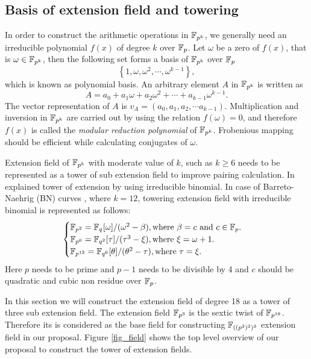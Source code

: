 \subsection{Basis of extension field and towering}
In order to construct the arithmetic operations in $\mathbb{F}_{p^k}$, we generally need an irreducible polynomial $f(x)$ of degree $k$ over $\mathbb{F}_p$. Let $\omega$ be a zero of $f(x)$, that is $\omega \in \mathbb{F}_{p^k}$, then the following set forms a basis of  $\mathbb{F}_{p^k}$ over $\mathbb{F}_p$
\begin{equation}\label{basis_fpm}
\left\lbrace 1, \omega, \omega^2 , \cdots, \omega^{k-1} \right\rbrace,
\end{equation}
which is known as polynomial basis. An arbitrary element $A$ in  $\mathbb{F}_{p^k}$ is written as
\begin{equation}\label{element_fpm}
A = a_0 +a_1\omega + a_2\omega^2 + \cdots + a_{k-1}\omega^{k-1}. 
\end{equation}
The vector representation of $A$ is   $v_A =(a_0, a_1, a_2, \cdots a_{k-1})$. Multiplication and inversion in  $\mathbb{F}_{p^k}$ are carried out by using the relation $f(\omega) = 0$, and therefore $f(x)$ is called the \textit{modular reduction polynomial} of  $\mathbb{F}_{p^k}$. Frobenious mapping should be efficient while calculating conjugates of $\omega$. 

Extension field of $\mathbb{F}_{p^k}$ with moderate value of $k$, such as $k \geq 6$ needs to be represented as a tower of sub extension field to improve pairing calculation. In \cite{lane2008draft}  explained tower of extension by using irreducible binomial. In case of Barreto-Naehrig (BN) curves  \cite{SAC:BarNae05}, where $k=12$, towering extension field with irreducible binomial is represented as follows:
\begin{equation}\label{eq:BN_towering}
\begin{cases}
{\mathbb{F}}_{p^{2}} = {\mathbb{F}}_{q^{}}[\omega]/(\omega^2-\beta), \mbox{where $\beta = c$ and $c \in \mathbb{F}_p$}.\nonumber \\ 
{\mathbb{F}}_{p^{6}} = {\mathbb{F}}_{q^{2}}[\tau]/(\tau^3-\xi), \mbox{where $\xi = \omega+1$}.\nonumber \\ 
{\mathbb{F}}_{p^{12}} = {\mathbb{F}}_{q^{6}}[\theta]/(\theta^2-\tau),\mbox{where $\tau = \xi$}. \nonumber \\ 
\end{cases}
\end{equation}
Here $p$ needs to be prime and $p-1$ needs to be divisible by 4 and $c$ should be quadratic and cubic non residue over $\mathbb{F}_p$.

In this section we will construct the extension field of degree 18 as a tower of three sub extension field. The extension field $\mathbb{F}_{p^3}$ is the sextic twist of $\mathbb{F}_{p^{18}}$. Therefore its is considered as the base field for constructing $\mathbb{F}_{((p^3)^2)^3}$ extension field in our proposal. Figure \ref{fig_field} shows the top level overview of our proposal to construct the tower of extension fields.


